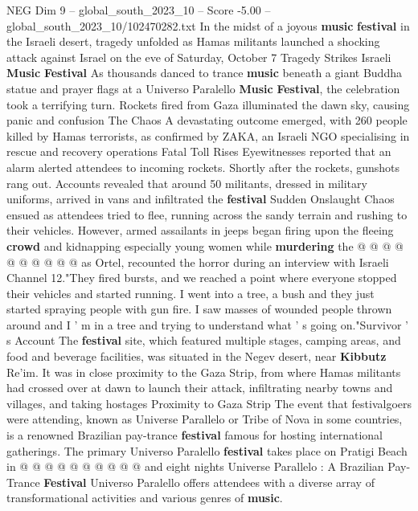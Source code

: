\begin{textsample}{NEG Dim 9 – global\_south\_2023\_10 – Score -5.00 – global\_south\_2023\_10/102470282.txt}  \label{ex:f9_neg_367}
In the midst of a joyous \textbf{music} \textbf{festival} in the Israeli desert, tragedy unfolded as Hamas militants launched a shocking attack against Israel on the eve of Saturday, October 7 Tragedy Strikes Israeli \textbf{Music} \textbf{Festival} As thousands danced to trance \textbf{music} beneath a giant Buddha statue and prayer flags at a Universo Paralello \textbf{Music} \textbf{Festival}, the celebration took a terrifying turn.
Rockets fired from Gaza illuminated the dawn sky, causing panic and confusion The Chaos A devastating outcome emerged, with 260 people killed by Hamas terrorists, as confirmed by ZAKA, an Israeli NGO specialising in rescue and recovery operations Fatal Toll Rises Eyewitnesses reported that an alarm alerted attendees to incoming rockets.
Shortly after the rockets, gunshots rang out.
Accounts revealed that around 50 militants, dressed in military uniforms, arrived in vans and infiltrated the \textbf{festival} Sudden Onslaught Chaos ensued as attendees tried to flee, running across the sandy terrain and rushing to their vehicles.
However, armed assailants in jeeps began firing upon the fleeing \textbf{crowd} and kidnapping especially young women while \textbf{murdering} the @ @ @ @ @ @ @ @ @ @ as Ortel, recounted the horror during an interview with Israeli Channel 12."They fired bursts, and we reached a point where everyone stopped their vehicles and started running.
I went into a tree, a bush and they just started spraying people with gun fire.
I saw masses of wounded people thrown around and I ' m in a tree and trying to understand what ' s going on."Survivor ' s Account The \textbf{festival} site, which featured multiple stages, camping areas, and food and beverage facilities, was situated in the Negev desert, near \textbf{Kibbutz} Re'im.
It was in close proximity to the Gaza Strip, from where Hamas militants had crossed over at dawn to launch their attack, infiltrating nearby towns and villages, and taking hostages Proximity to Gaza Strip The event that festivalgoers were attending, known as Universe Parallelo or Tribe of Nova in some countries, is a renowned Brazilian pay-trance \textbf{festival} famous for hosting international gatherings.
The primary Universo Paralello \textbf{festival} takes place on Pratigi Beach in @ @ @ @ @ @ @ @ @ @ and eight nights Universe Parallelo : A Brazilian Pay-Trance \textbf{Festival} Universo Paralello offers attendees with a diverse array of transformational activities and various genres of \textbf{music}.

\end{textsample}
